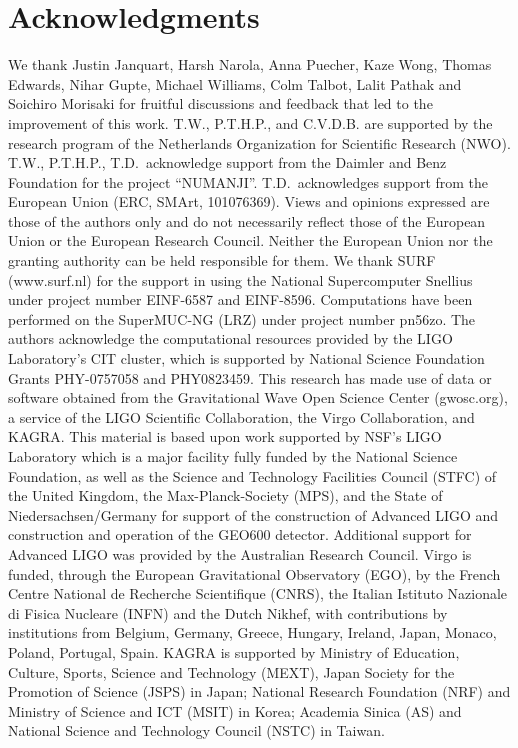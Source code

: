 \documentclass[prd,twocolumn,a4paper,floatfix,nofootinbib,preprintnumbers,superscriptaddress]{revtex4-1}
\begin{document}
\section*{Acknowledgments}
We thank Justin Janquart, Harsh Narola, Anna Puecher, Kaze Wong, Thomas Edwards, Nihar Gupte,  Michael Williams, Colm Talbot, Lalit Pathak and Soichiro Morisaki for fruitful discussions and feedback that led to the improvement of this work.
T.W., P.T.H.P., and C.V.D.B. are supported by the research program of the Netherlands Organization for Scientific Research (NWO).
T.W., P.T.H.P., T.D.\ acknowledge support from the Daimler and Benz Foundation for the project ``NUMANJI''. T.D.\ acknowledges support from the European Union (ERC, SMArt, 101076369). Views and opinions expressed are those of the authors only and do not necessarily reflect those of the European Union or the European Research Council. Neither the European Union nor the granting authority can be held responsible for them.
We thank SURF (www.surf.nl) for the support in using the National Supercomputer Snellius under project number EINF-6587 and EINF-8596.
Computations have been performed on the SuperMUC-NG (LRZ) under project number pn56zo.
The authors acknowledge the computational resources provided by the LIGO Laboratory's CIT cluster, which is supported by National Science Foundation Grants PHY-0757058 and PHY0823459.
This research has made use of data or software obtained from the Gravitational Wave Open Science Center (gwosc.org), a service of the LIGO Scientific Collaboration, the Virgo Collaboration, and KAGRA. This material is based upon work supported by NSF's LIGO Laboratory which is a major facility fully funded by the National Science Foundation, as well as the Science and Technology Facilities Council (STFC) of the United Kingdom, the Max-Planck-Society (MPS), and the State of Niedersachsen/Germany for support of the construction of Advanced LIGO and construction and operation of the GEO600 detector. Additional support for Advanced LIGO was provided by the Australian Research Council. Virgo is funded, through the European Gravitational Observatory (EGO), by the French Centre National de Recherche Scientifique (CNRS), the Italian Istituto Nazionale di Fisica Nucleare (INFN) and the Dutch Nikhef, with contributions by institutions from Belgium, Germany, Greece, Hungary, Ireland, Japan, Monaco, Poland, Portugal, Spain. KAGRA is supported by Ministry of Education, Culture, Sports, Science and Technology (MEXT), Japan Society for the Promotion of Science (JSPS) in Japan; National Research Foundation (NRF) and Ministry of Science and ICT (MSIT) in Korea; Academia Sinica (AS) and National Science and Technology Council (NSTC) in Taiwan.
\end{document}
